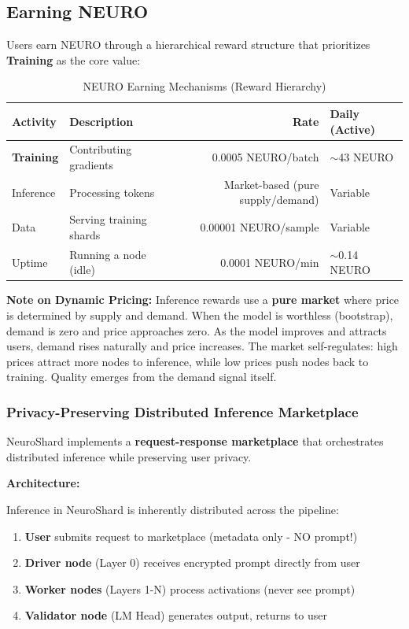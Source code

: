 \documentclass[11pt,a4paper]{article}
\begin{document}
\subsection{Earning NEURO}

Users earn NEURO through a hierarchical reward structure that prioritizes \textbf{Training} as the core value:

\begin{table}[H]
\centering
\caption{NEURO Earning Mechanisms (Reward Hierarchy)}
\begin{tabular}{@{}llrl@{}}
\toprule
\textbf{Activity} & \textbf{Description} & \textbf{Rate} & \textbf{Daily (Active)} \\
\midrule
\textbf{Training} & Contributing gradients & 0.0005 NEURO/batch & $\sim$43 NEURO \\
Inference & Processing tokens & Market-based (pure supply/demand) & Variable \\
Data & Serving training shards & 0.00001 NEURO/sample & Variable \\
Uptime & Running a node (idle) & 0.0001 NEURO/min & $\sim$0.14 NEURO \\
\bottomrule
\end{tabular}
\end{table}

\textbf{Note on Dynamic Pricing:} Inference rewards use a \textbf{pure market} where price is determined by supply and demand. When the model is worthless (bootstrap), demand is zero and price approaches zero. As the model improves and attracts users, demand rises naturally and price increases. The market self-regulates: high prices attract more nodes to inference, while low prices push nodes back to training. Quality emerges from the demand signal itself.

\subsubsection{Privacy-Preserving Distributed Inference Marketplace}

NeuroShard implements a \textbf{request-response marketplace} that orchestrates distributed inference while preserving user privacy.

\textbf{Architecture:}

Inference in NeuroShard is inherently distributed across the pipeline:
\begin{enumerate}
    \item \textbf{User} submits request to marketplace (metadata only - NO prompt!)
    \item \textbf{Driver node} (Layer 0) receives encrypted prompt directly from user
    \item \textbf{Worker nodes} (Layers 1-N) process activations (never see prompt)
    \item \textbf{Validator node} (LM Head) generates output, returns to user
\end{enumerate}
\end{document}
